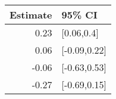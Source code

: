 \begin{tabular}{rl}
  \hline
Estimate & 95\% CI \\ 
  \hline
0.23 & [0.06,0.4] \\ 
  0.06 & [-0.09,0.22] \\ 
  -0.06 & [-0.63,0.53] \\ 
  -0.27 & [-0.69,0.15] \\ 
   \hline
\end{tabular}

